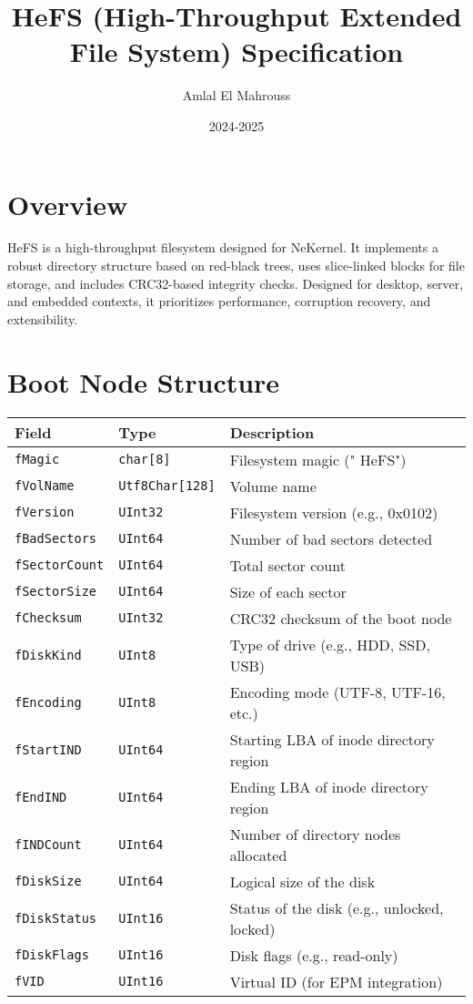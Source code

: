 \documentclass{article}
\title{HeFS (High-Throughput Extended File System) Specification}
\author{Amlal El Mahrouss}
\date{2024-2025}
\begin{document}
\maketitle

\section{Overview}
HeFS is a high-throughput filesystem designed for NeKernel. It implements a robust directory structure based on red-black trees, uses slice-linked blocks for file storage, and includes CRC32-based integrity checks. Designed for desktop, server, and embedded contexts, it prioritizes performance, corruption recovery, and extensibility.

\section{Boot Node Structure}
\begin{longtable}{|l|l|p{8cm}|}
\hline
\textbf{Field} & \textbf{Type} & \textbf{Description} \\
\hline
\verb|fMagic| & \verb|char[8]| & Filesystem magic ("  HeFS") \\
\verb|fVolName| & \verb|Utf8Char[128]| & Volume name \\
\verb|fVersion| & \verb|UInt32| & Filesystem version (e.g., 0x0102) \\
\verb|fBadSectors| & \verb|UInt64| & Number of bad sectors detected \\
\verb|fSectorCount| & \verb|UInt64| & Total sector count \\
\verb|fSectorSize| & \verb|UInt64| & Size of each sector \\
\verb|fChecksum| & \verb|UInt32| & CRC32 checksum of the boot node \\
\verb|fDiskKind| & \verb|UInt8| & Type of drive (e.g., HDD, SSD, USB) \\
\verb|fEncoding| & \verb|UInt8| & Encoding mode (UTF-8, UTF-16, etc.) \\
\verb|fStartIND| & \verb|UInt64| & Starting LBA of inode directory region \\
\verb|fEndIND| & \verb|UInt64| & Ending LBA of inode directory region \\
\verb|fINDCount| & \verb|UInt64| & Number of directory nodes allocated \\
\verb|fDiskSize| & \verb|UInt64| & Logical size of the disk \\
\verb|fDiskStatus| & \verb|UInt16| & Status of the disk (e.g., unlocked, locked) \\
\verb|fDiskFlags| & \verb|UInt16| & Disk flags (e.g., read-only) \\
\verb|fVID| & \verb|UInt16| & Virtual ID (for EPM integration) \\
\hline
\end{longtable}
\end{document}
